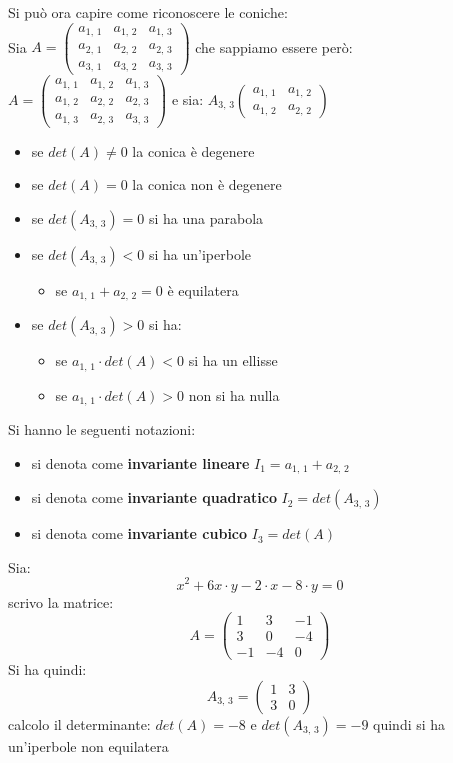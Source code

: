 \documentclass[a4paper,12pt, oneside]{book}
\begin{document}
Si può ora capire come riconoscere le coniche:\\
Sia $A=
\left(\begin{matrix}
a_{1,\,1} & a_{1,\,2} & a_{1,\,3}\\
a_{2,\,1} & a_{2,\,2} & a_{2,\,3}\\
a_{3,\,1} & a_{3,\,2} & a_{3,\,3}
\end{matrix}\right)$ che sappiamo essere però:
$A=
\left(\begin{matrix}
a_{1,\,1} & a_{1,\,2} & a_{1,\,3}\\
a_{1,\,2} & a_{2,\,2} & a_{2,\,3}\\
a_{1,\,3} & a_{2,\,3} & a_{3,\,3}
\end{matrix}\right)$
e sia:
$
A_{3,\,3}\left(\begin{matrix}
a_{1,\,1} & a_{1,\,2} \\
a_{1,\,2} & a_{2,\,2} 
\end{matrix}\right)
$
\begin{itemize}
\item se $det(A)\neq 0 $ la conica è degenere
\item se $det(A)=0 $ la conica non è degenere
\item se $det(A_{3,\,3})= 0 $ si ha una parabola
\item se $det(A_{3,\,3})< 0 $ si ha un'iperbole
\begin{itemize}
\item se $a_{1,\,1}+a_{2,\,2}=0$ è equilatera
\end{itemize}
\item se $det(A_{3,\,3})>0$ si ha:
\begin{itemize}
\item se $a_{1,\,1}\cdot det(A)<0$ si ha un ellisse
\item se $a_{1,\,1}\cdot det(A)>0$ non si ha nulla
\end{itemize}
\end{itemize}
Si hanno le seguenti notazioni:
\begin{itemize}
\item si denota come \textbf{invariante lineare} $I_1=a_{1,\,1}+a_{2,\,2}$
\item si denota come \textbf{invariante quadratico}  $I_2=det(A_{3,\,3})$
\item si denota come \textbf{invariante cubico} $I_3=det(A)$
\end{itemize}
\newpage
\begin{esempio}
Sia:
$$x^2+6x\cdot y-2\cdot x-8\cdot y=0$$
scrivo la matrice:
$$
A=\left(\begin{matrix}
1 & 3 & -1\\
3 & 0 & -4\\
-1 & -4 & 0
\end{matrix}\right)
$$
Si ha quindi:
$$
A_{3,\,3}=\left(\begin{matrix}
1 & 3\\
3 & 0 
\end{matrix}\right)
$$
calcolo il determinante: $det(A)=-8$ e $det(A_{3,\,3})=-9$ quindi si ha un'iperbole non equilatera
\end{esempio}
\end{document}
